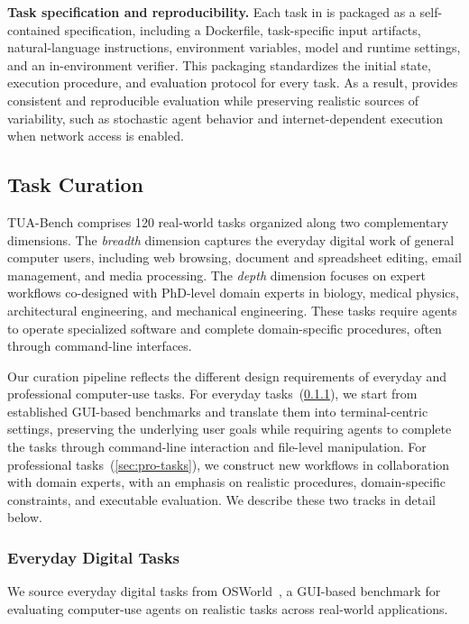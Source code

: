 \noindent\textbf{Task specification and reproducibility.}
Each task in \benchname is packaged as a self-contained specification, including a Dockerfile, task-specific input artifacts, natural-language instructions, environment variables, model and runtime settings, and an in-environment verifier. This packaging standardizes the initial state, execution procedure, and evaluation protocol for every task. As a result, \benchname provides consistent and reproducible evaluation while preserving realistic sources of variability, such as stochastic agent behavior and internet-dependent execution when network access is enabled.


\subsection{Task Curation}\label{sec:task-curation}
TUA-Bench comprises 120 real-world tasks organized along two complementary dimensions. The \emph{breadth} dimension captures the everyday digital work of general computer users, including web browsing, document and spreadsheet editing, email management, and media processing. The \emph{depth} dimension focuses on expert workflows co-designed with PhD-level domain experts in biology, medical physics, architectural engineering, and mechanical engineering. These tasks require agents to operate specialized software and complete domain-specific procedures, often through command-line interfaces.

Our curation pipeline reflects the different design requirements of everyday and professional computer-use tasks. For everyday tasks~(\cref{sec:everyday-task}), we start from established GUI-based benchmarks and translate them into terminal-centric settings, preserving the underlying user goals while requiring agents to complete the tasks through command-line interaction and file-level manipulation. For professional tasks~(\cref{sec:pro-tasks}), we construct new workflows in collaboration with domain experts, with an emphasis on realistic procedures, domain-specific constraints, and executable evaluation. We describe these two tracks in detail below.


\subsubsection{Everyday Digital Tasks}\label{sec:everyday-task}
We source everyday digital tasks from OSWorld~\citep{xie2024osworld}, a GUI-based benchmark for evaluating computer-use agents on realistic tasks across real-world applications.

